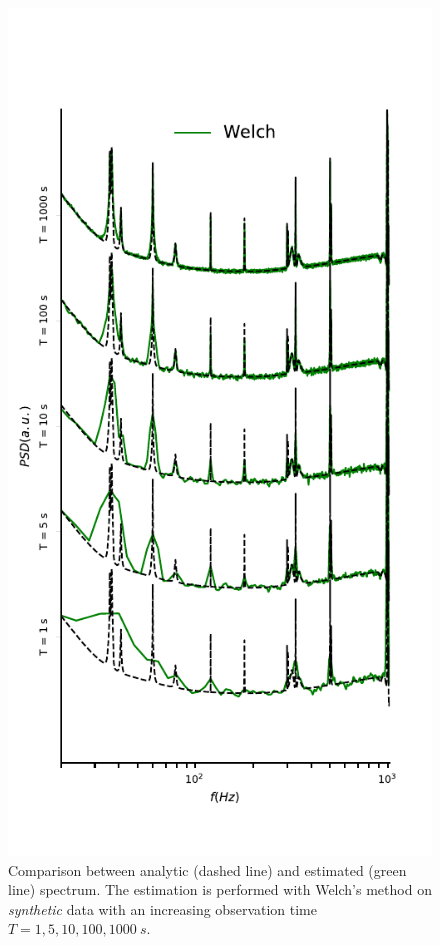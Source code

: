 \documentclass[twocolumn,showpacs,preprintnumbers,nofootinbib,prd,
superscriptaddress,10pt]{revtex4-1}
\begin{document}
\begin{figure}
\begin{minipage}{0.99\columnwidth}
\end{minipage}\hfill
\begin{minipage}{0.99\columnwidth}
	\caption{Comparison between analytic (dashed line) and estimated (green line) spectrum. The estimation is performed with Welch's method on \textit{synthetic} data with an increasing observation time $T = 1, 5, 10, 100, \SI{1000}{s}$.}
	\label{fig:welch_LIGO_data}
	\includegraphics{Images/comparison_LVC_data/comparison_LVC_data_Welch.pdf}
\end{minipage}

\end{figure}
\end{document}
